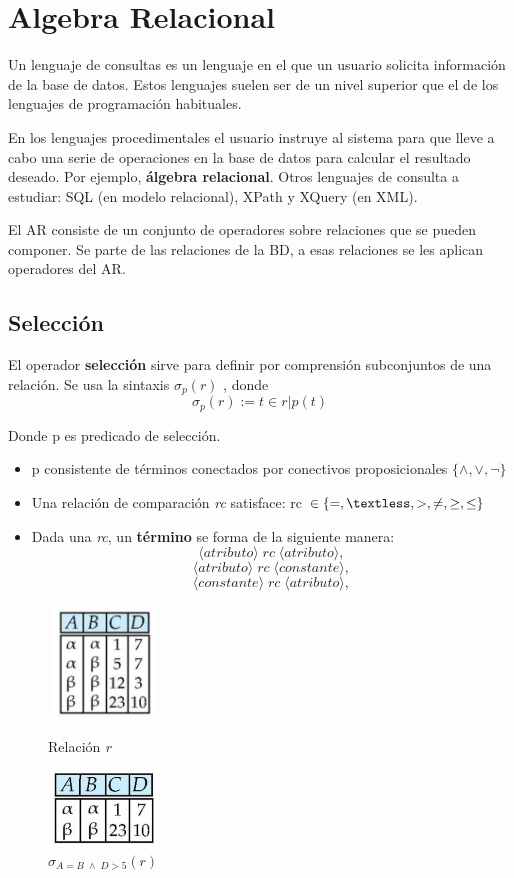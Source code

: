 \documentclass[12pt,a4paper]{report}
\newcounter{neq}
\begin{document}
			
\chapter{Algebra Relacional}
		\par Un lenguaje de consultas es un lenguaje en el que un usuario solicita información de la base de datos. Estos lenguajes suelen ser de un nivel superior que el de los lenguajes de programación habituales.
		\par En los lenguajes procedimentales el usuario instruye al sistema para que lleve a cabo una serie de operaciones en la base de datos para calcular el resultado deseado. Por ejemplo, \textbf{álgebra relacional}. Otros lenguajes de consulta a estudiar: SQL (en modelo relacional), XPath y XQuery (en XML).
		\par El AR consiste de un conjunto de operadores sobre relaciones que se pueden componer. Se parte de las relaciones de la BD, a esas relaciones se les aplican operadores del AR.
	
	\section{Selección}
		\par El operador \textbf{selección} sirve para definir por comprensión subconjuntos de una relación. Se usa la sintaxis $\sigma_{p}(r)$ , donde
		\[\sigma_{p}(r) := {t \in r | p(t)} \]
		\par Donde p es predicado de selección.
			\begin{itemize}
				\item p consistente de términos conectados por conectivos proposicionales $\{ \land, \lor, \neg \}$
				\item Una relación de comparación \textit{rc} satisface: rc $\in \{=, \textless, >, \neq, \geq, \leq \}$ 
				\item Dada una \textit{rc}, un \textbf{término} se forma de la siguiente manera:
				\[ \langle atributo \rangle \; rc \; \langle atributo \rangle,\]
				\[ \langle atributo \rangle \; rc \; \langle constante \rangle,\]
				\[ \langle constante \rangle \; rc \; \langle atributo \rangle,\]
			\end{itemize}

			\begin{figure}[htb]
				\centering
				\includegraphics[width=3cm, height=3cm]{./imagenes/seleccion1.png}
				\caption{Relación \textit{r}}
				\vspace{5mm}
				\includegraphics[width=3cm, height=2cm]{./imagenes/seleccion2.png}
				\caption{$\sigma_{A=B \; \land \; D > 5}(r)$}
			\end{figure}
\end{document}
